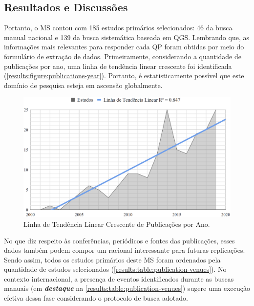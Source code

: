 \subsection{Resultados e Discussões}
\label{ms:resultados}

Portanto, o MS contou com 185 estudos primários selecionados: 46 da busca manual nacional e 139 da busca sistemática baseada em QGS. Lembrando que, as informações mais relevantes para responder cada QP foram obtidas por meio do formulário de extração de dados. Primeiramente, considerando a quantidade de publicações por ano, uma linha de tendência linear crescente foi identificada (\autoref{results:figure:publications-year}). Portanto, é estatisticamente possível que este domínio de pesquisa esteja em ascensão globalmente.


\begin{figure}[htb]
\centering 
\caption{Linha de Tendência Linear Crescente de Publicações por Ano.}
\label{results:figure:publications-year}
\includegraphics[width=1\textwidth]{images/chapter2-sm-publications-timeline.png}
\fautor
\end{figure}


No que diz respeito às conferências, periódicos e fontes das publicações, esses dados também podem compor um racional interessante para futuras replicações. Sendo assim, todos os estudos primários deste MS foram ordenados pela quantidade de estudos selecionados (\autoref{results:table:publication-venues}). No contexto internacional, a presença de eventos identificados durante as buscas manuais (em \textbf{\textit{destaque}} na \autoref{results:table:publication-venues}) sugere uma execução efetiva dessa fase considerando o protocolo de busca adotado.

